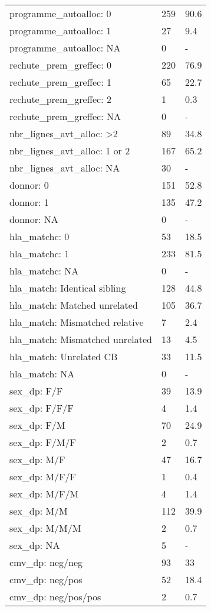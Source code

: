 \documentclass{article}
\begin{document}
\begin{longtable}{lll}
  programme_autoalloc: 0 & 259 & 90.6 \\ 
  programme_autoalloc: 1 & 27 & 9.4 \\ 
  programme_autoalloc: NA & 0 & - \\ 
  rechute_prem_greffec: 0 & 220 & 76.9 \\ 
  rechute_prem_greffec: 1 & 65 & 22.7 \\ 
  rechute_prem_greffec: 2 & 1 & 0.3 \\ 
  rechute_prem_greffec: NA & 0 & - \\ 
  nbr_lignes_avt_alloc: >2 & 89 & 34.8 \\ 
  nbr_lignes_avt_alloc: 1 or 2 & 167 & 65.2 \\ 
  nbr_lignes_avt_alloc: NA & 30 & - \\ 
  donnor: 0 & 151 & 52.8 \\ 
  donnor: 1 & 135 & 47.2 \\ 
  donnor: NA & 0 & - \\ 
  hla_matchc: 0 & 53 & 18.5 \\ 
  hla_matchc: 1 & 233 & 81.5 \\ 
  hla_matchc: NA & 0 & - \\ 
  hla_match: Identical sibling & 128 & 44.8 \\ 
  hla_match: Matched unrelated & 105 & 36.7 \\ 
  hla_match: Mismatched relative & 7 & 2.4 \\ 
  hla_match: Mismatched unrelated & 13 & 4.5 \\ 
  hla_match: Unrelated CB & 33 & 11.5 \\ 
  hla_match: NA & 0 & - \\ 
  sex_dp: F/F & 39 & 13.9 \\ 
  sex_dp: F/F/F & 4 & 1.4 \\ 
  sex_dp: F/M & 70 & 24.9 \\ 
  sex_dp: F/M/F & 2 & 0.7 \\ 
  sex_dp: M/F & 47 & 16.7 \\ 
  sex_dp: M/F/F & 1 & 0.4 \\ 
  sex_dp: M/F/M & 4 & 1.4 \\ 
  sex_dp: M/M & 112 & 39.9 \\ 
  sex_dp: M/M/M & 2 & 0.7 \\ 
  sex_dp: NA & 5 & - \\ 
  cmv_dp: neg/neg & 93 & 33 \\ 
  cmv_dp: neg/pos & 52 & 18.4 \\ 
  cmv_dp: neg/pos/pos & 2 & 0.7 \\ 

\end{longtable}
\end{document}
